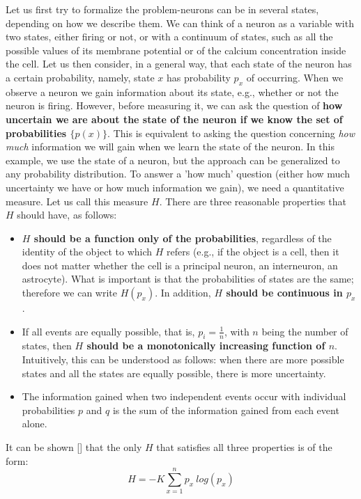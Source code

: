 Let us first try to formalize the problem-neurons can be in several states, depending on how we describe them. 
We can think of a neuron as a variable with two states, either firing or not, or with a continuum of states, such as all the possible values of its membrane potential or of the calcium concentration inside the cell.
Let us then consider, in a general way, that each state of the neuron has a certain probability, namely, state $x$ has probability $p_x$ of occurring.
When we observe a neuron we gain information about its state, e.g., whether or not the neuron is firing. 
However, before measuring it, we can ask the question of \textbf{how uncertain we are about the state of the neuron if we know the set of probabilities $\{p(x)\}$}.
This is equivalent to asking the question concerning \textit{how much} information we will gain when we learn the state of the neuron. 
In this example, we use the state of a neuron, but the approach can be generalized to any probability distribution.
To answer a 'how much' question (either how much uncertainty we have or how much information we gain), we need a quantitative measure. 
Let us call this measure $H$.
There are three reasonable properties that $H$ should have, as follows:
\begin{itemize}
    \item \textbf{$H$ should be a function only of the probabilities}, regardless of the identity of the object to which $H$ refers (e.g., if the object is a cell, then it does not matter whether the cell is a principal neuron, an interneuron, an astrocyte). 
    What is important is that the probabilities of states are the same; therefore we can write $H(p_x)$.
    In addition, \textbf{$H$ should be continuous in $p_x$}.
    \item If all events are equally possible, that is, $p_i=\frac{1}{n}$, with $n$ being the number of states, then \textbf{$H$ should be a monotonically increasing function of $n$}.
    Intuitively, this can be understood as follows: when there are more possible states and all the states are equally possible, there is more uncertainty.
    \item The information gained when two independent events occur with individual probabilities $p$ and $q$ is the sum of the information gained from each event alone.
\end{itemize}
It can be shown [\cite{shannon1948}] that the only $H$ that satisfies all three properties is of the form: 
\begin{equation}
    H=-K \sum_{x=1}^n p_x\ log (p_x)
\end{equation}
